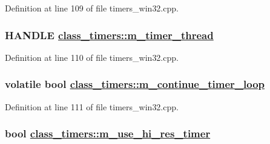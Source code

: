 Definition at line 109 of file timers\_\-win32.cpp.\hypertarget{classclass__timers_8d08585f4ba63c21b4636863499b9e05}{
\subsubsection[m\_\-timer\_\-thread]{\setlength{\rightskip}{0pt plus 5cm}HANDLE \hyperlink{classclass__timers_8d08585f4ba63c21b4636863499b9e05}{class\_\-timers::m\_\-timer\_\-thread}}}
\label{classclass__timers_8d08585f4ba63c21b4636863499b9e05}




Definition at line 110 of file timers\_\-win32.cpp.\hypertarget{classclass__timers_957a0cc71456a57fd5cb640122fe924a}{
\subsubsection[m\_\-continue\_\-timer\_\-loop]{\setlength{\rightskip}{0pt plus 5cm}volatile bool \hyperlink{classclass__timers_957a0cc71456a57fd5cb640122fe924a}{class\_\-timers::m\_\-continue\_\-timer\_\-loop}}}
\label{classclass__timers_957a0cc71456a57fd5cb640122fe924a}




Definition at line 111 of file timers\_\-win32.cpp.\hypertarget{classclass__timers_5fdc6eb0abb2689d078b333b083bfcb0}{
\subsubsection[m\_\-use\_\-hi\_\-res\_\-timer]{\setlength{\rightskip}{0pt plus 5cm}bool \hyperlink{classclass__timers_5fdc6eb0abb2689d078b333b083bfcb0}{class\_\-timers::m\_\-use\_\-hi\_\-res\_\-timer}}}
\label{classclass__timers_5fdc6eb0abb2689d078b333b083bfcb0}





